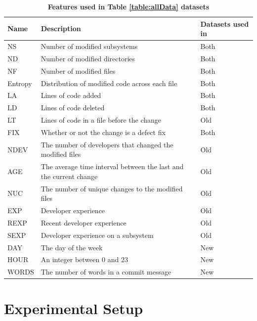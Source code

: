 \documentclass[../main.tex]{subfiles}
\begin{document}
\begin{table}[H]
    \centering
     \caption{\textbf{Features used in Table \ref{table:allData} datasets}}
   \begin{tabular}{|P{15mm} |p{85mm} |P{30mm} |} 
        \hline
        \textbf{Name} & \textbf{Description} & \textbf{Datasets used in}\\ 
        \hline\hline
        NS & Number of modified subsystems & Both\\
        \hline
        ND & Number of modified directories & Both\\
        \hline
        NF & Number of modified files & Both\\
        \hline
        Entropy & Distribution of modified code across each file & Both\\
        \hline
        LA & Lines of code added& Both\\
        \hline
        LD & Lines of code deleted & Both\\
        \hline
        LT & Lines of code in a file before the change & Old \\
        \hline
        FIX & Whether or not the change is a defect fix & Both\\
        \hline
        NDEV & The number of developers that changed the modified files & Old \\
        \hline
        AGE & The average time interval between the last and the current change & Old\\
        \hline
        NUC & The number of unique changes to the modified files & Old\\
        \hline
        EXP & Developer experience & Old \\
        \hline
        REXP & Recent developer experience & Old \\
        \hline
        SEXP & Developer experience on a subsystem & Old \\
        \hline
        DAY & The day of the week & New\\
        \hline
        HOUR & An integer between 0 and 23 & New\\
        \hline
        WORDS & The number of words in a commit message & New\\
        \hline

\end{tabular}
    \label{table:Features}
\end{table}

\section{Experimental Setup}
\end{document}
